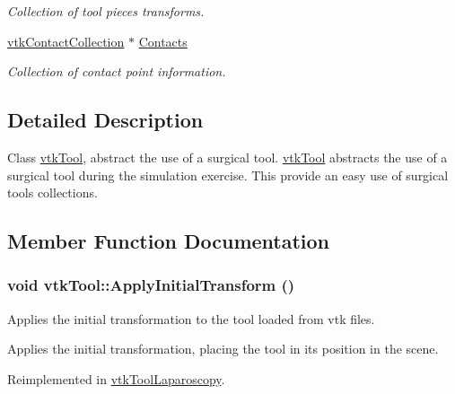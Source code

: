 \begin{DoxyCompactItemize}
\begin{DoxyCompactList}\small\item\em Collection of tool pieces transforms. \item\end{DoxyCompactList}\item 
\hypertarget{classvtkTool_a4c5762114b1d850f0f471d260c45ebaf}{
\hyperlink{classvtkContactCollection}{vtkContactCollection} $\ast$ \hyperlink{classvtkTool_a4c5762114b1d850f0f471d260c45ebaf}{Contacts}}
\label{classvtkTool_a4c5762114b1d850f0f471d260c45ebaf}

\begin{DoxyCompactList}\small\item\em Collection of contact point information. \item\end{DoxyCompactList}\end{DoxyCompactItemize}


\subsection{Detailed Description}
Class \hyperlink{classvtkTool}{vtkTool}, abstract the use of a surgical tool. \hyperlink{classvtkTool}{vtkTool} abstracts the use of a surgical tool during the simulation exercise. This provide an easy use of surgical tools collections. 

\subsection{Member Function Documentation}
\hypertarget{classvtkTool_af5802e4ba0d2c217bef741ce55ee2b0e}{
\subsubsection[{ApplyInitialTransform}]{\setlength{\rightskip}{0pt plus 5cm}void vtkTool::ApplyInitialTransform ()}}
\label{classvtkTool_af5802e4ba0d2c217bef741ce55ee2b0e}


Applies the initial transformation to the tool loaded from vtk files. 

Applies the initial transformation, placing the tool in its position in the scene. 

Reimplemented in \hyperlink{classvtkToolLaparoscopy_a55c7ce0e9156ae3547dbe32a4fef1057}{vtkToolLaparoscopy}.

